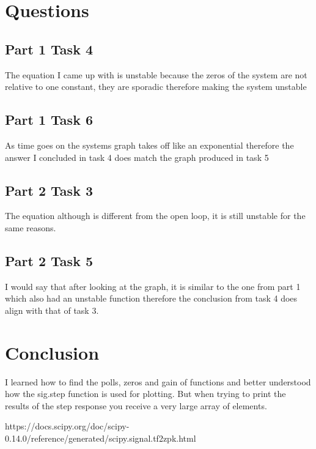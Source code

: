 \documentclass[12pt]{report}
\begin{document}
\section{Questions}

\subsection{Part 1 Task 4} 
The equation I came up with is unstable because the zeros of the system are not relative to one constant, they are sporadic therefore making the system unstable 

\subsection{Part 1 Task 6} 

As time goes on the systems graph takes off like an exponential therefore the answer I concluded in task 4 does match the graph produced in task 5

\subsection{Part 2 Task 3} 
The equation although is different from the open loop, it is still unstable for the same reasons. 

\subsection{Part 2 Task 5} 

I would say that after looking at the graph, it is similar to the one from part 1 which also had an unstable function therefore the conclusion from task 4 does align with that of task 3.

\section{Conclusion}

I learned how to find the polls, zeros and gain of functions and better understood how the sig.step function is used for plotting. But when trying to print the results of the step response you receive a very large array of elements. 

\newpage


\begin{thebibliography}{111}

https://docs.scipy.org/doc/scipy-0.14.0/reference/generated/scipy.signal.tf2zpk.html



\end{thebibliography}
\end{document}
